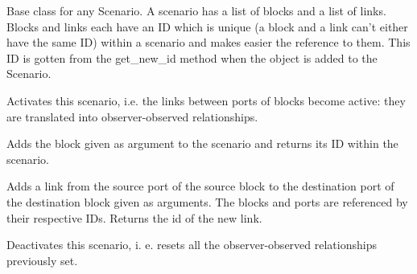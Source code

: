 \documentclass[letterpaper,10pt,english]{sphinxmanual}
\begin{document}
\begin{fulllineitems}
\label{api/scenario:scenario.Scenario}
Base class for any Scenario.
A scenario has a list of blocks and a list of links. 
Blocks and links each have an ID which is unique (a block and
a link can't either have the same ID) within a scenario and
makes easier the reference to them. This ID is gotten from
the get\_new\_id method when the object is added to the 
Scenario.

\begin{fulllineitems}
\label{api/scenario:scenario.Scenario.activate}
Activates this scenario, i.e. the links between ports
of blocks become active: they are translated into 
observer-observed relationships.

\end{fulllineitems}


\begin{fulllineitems}
\label{api/scenario:scenario.Scenario.add_block}
Adds the block given as argument to the scenario 
and returns its ID within the scenario.

\end{fulllineitems}


\begin{fulllineitems}
\label{api/scenario:scenario.Scenario.add_link}
Adds a link from the source port of the source block 
to the destination port of the destination block given 
as arguments.
The blocks and ports are referenced by their respective IDs. 
Returns the id of the new link.

\end{fulllineitems}


\begin{fulllineitems}
\label{api/scenario:scenario.Scenario.deactivate}
Deactivates this scenario, i. e. resets all the 
observer-observed relationships previously set.


\end{fulllineitems}
\end{fulllineitems}
\end{document}
